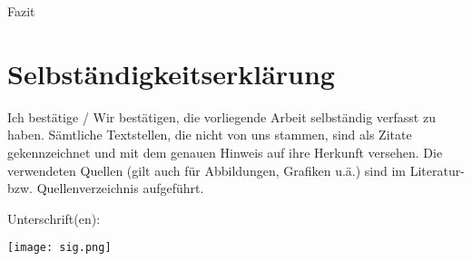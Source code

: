 Fazit

\chapter{Selbständigkeitserklärung}

Ich bestätige / Wir bestätigen, die vorliegende Arbeit selbständig verfasst zu haben. Sämtliche Textstellen, die nicht von uns stammen, sind als Zitate gekennzeichnet und mit dem genauen Hinweis auf ihre Herkunft versehen. Die verwendeten Quellen (gilt auch für Abbildungen, Grafiken u.ä.) sind im Literatur- bzw. Quellenverzeichnis aufgeführt.



Unterschrift(en):

\texttt{[image: sig.png]}